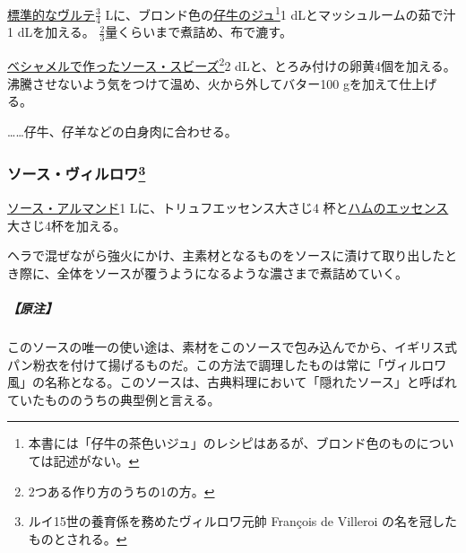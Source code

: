 \begin{recette}

 

\protect\hyperlink{veloute}{標準的なヴルテ}\(\frac{3}{4}\)
Lに、ブロンド色の\protect\hyperlink{jus-de-veau-brun}{仔牛のジュ}\footnote{本書には「仔牛の茶色いジュ」のレシピはあるが、ブロンド色のものについては記述がない。}1
dLとマッシュルームの茹で汁1 dLを加える。
\(\frac{2}{3}\)量くらいまで煮詰め、布で漉す。

\protect\hyperlink{sauce-soubise}{ベシャメルで作ったソース・スビーズ}\footnote{2つある作り方のうちの1の方。}2
dLと、とろみ付けの卵黄4個を加える。沸騰させないよう気をつけて温め、火から外してバター100
gを加えて仕上げる。

\ldots{}\ldots{}仔牛、仔羊などの白身肉に合わせる。

\atoaki{}

\hypertarget{sauce-villeroy}{%
\subsubsection[ソース・ヴィルロワ]{\texorpdfstring{ソース・ヴィルロワ\footnote{ルイ15世の養育係を務めたヴィルロワ元帥
  François de Villeroi の名を冠したものとされる。}}{ソース・ヴィルロワ}}\label{sauce-villeroy}}


 

\protect\hyperlink{sauce-allemande}{ソース・アルマンド}1
Lに、トリュフエッセンス大さじ4
杯と\protect\hyperlink{essences-diverses}{ハムのエッセンス}大さじ4杯を加える。

ヘラで混ぜながら強火にかけ、主素材となるものをソースに漬けて取り出したとき際に、全体をソースが覆うようになるような濃さまで煮詰めていく。

\hypertarget{nota-sauce-villeroy}{%
\subparagraph{【原注】}\label{nota-sauce-villeroy}}

このソースの唯一の使い途は、素材をこのソースで包み込んでから、イギリス式パン粉衣を付けて揚げるものだ。この方法で調理したものは常に「ヴィルロワ風」の名称となる。このソースは、古典料理において「隠れたソース」と呼ばれていたもののうちの典型例と言える。


\end{recette}
